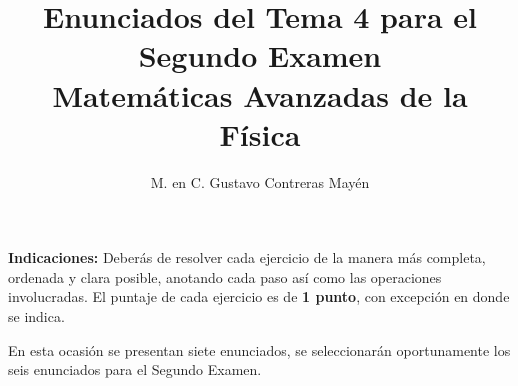 
\title{Enunciados del Tema 4 para el Segundo Examen \\[0.3em]  \large{Matemáticas Avanzadas de la Física}\vspace{-3ex}}
\author{M. en C. Gustavo Contreras Mayén}
\date{ }

\vspace{-4cm}
\maketitle
\fontsize{14}{14}\selectfont

\textbf{Indicaciones: } Deberás de resolver cada ejercicio de la manera más completa, ordenada y clara posible, anotando cada paso así como las operaciones involucradas. El puntaje de cada ejercicio es de \textbf{1 punto}, con excepción en donde se indica.
\par
En esta ocasión se presentan siete enunciados, se seleccionarán oportunamente los seis enunciados para el Segundo Examen.

